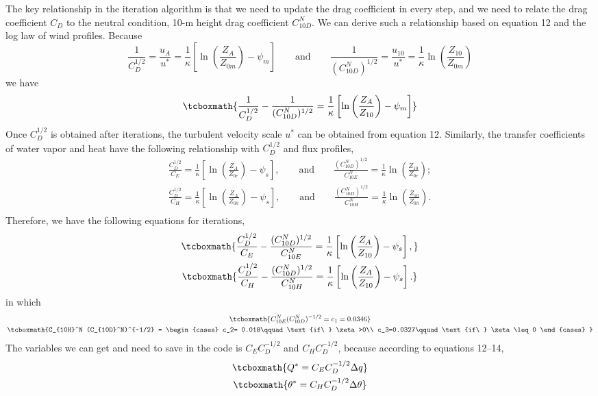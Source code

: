 \documentclass[a4paper,11pt]{article}
\begin{document}
The key relationship in the iteration algorithm is that we need to update the drag coefficient in every step, and we need to relate the drag coefficient $C_D$ to the neutral condition, 10-m height drag coefficient $C_{10D}^N$. We can derive such a relationship based on equation 12 and the log law of wind profiles. Because
\begin{equation*}
\frac{1}{C_D^{1/2}} = \frac{u_A}{u^*} = \frac{1}{\kappa}\left[\ln\left(\frac{Z_A}{Z_{0m}}\right) - \psi_m \right]\qquad \text{and}\qquad
\frac{1}{(C_{10D}^N)^{1/2}} = \frac{u_{10}}{u^*}= \frac{1}{\kappa}\ln\left(\frac{Z_{10}}{Z_{0m}}\right)
\end{equation*}
we have
\begin{equation}
\tcboxmath{
\frac{1}{C_D^{1/2}} - \frac{1}{ (C_{10D}^N)^{1/2}} = \frac{1}{\kappa}\left[ \ln\left(\frac{Z_A}{Z_{10}}\right) - \psi_m\right]
}
\end{equation}
Once $C_D^{1/2}$ is obtained after iterations, the turbulent velocity scale $u^*$ can be obtained from equation 12. Similarly, the transfer coefficients of water vapor and heat have the following relationship with $C_D^{1/2}$ and flux profiles,
\begin{gather}
\frac{C_D^{1/2}}{C_E} = \frac{1}{\kappa}\left[\ln\left(\frac{Z_A}{Z_{0e}}\right) - \psi_s  \right], \qquad\text{and}\qquad 
\frac{(C_{10D}^N)^{1/2}}{C_{10E}^N} = \frac{1}{\kappa} \ln\left(\frac{Z_{10}}{Z_{0e}}\right);\\
\frac{C_D^{1/2}}{C_H} = \frac{1}{\kappa}\left[\ln\left(\frac{Z_A}{Z_{0h}}\right) - \psi_s  \right], \qquad\text{and}\qquad 
\frac{(C_{10D}^N)^{1/2}}{C_{10H}^N} = \frac{1}{\kappa} \ln\left(\frac{Z_{10}}{Z_{0h}}\right).\\
\end{gather}
Therefore, we have the following equations for iterations,
\begin{gather}
\tcboxmath{\frac{C_D^{1/2}}{C_E} - \frac{(C_{10D}^N)^{1/2}}{C_{10E}^N} = \frac{1}{\kappa}\left[\ln\left(\frac{Z_A}{Z_{10}}\right) - \psi_s  \right],} \\
\tcboxmath{\frac{C_D^{1/2}}{C_H} - \frac{(C_{10D}^N)^{1/2}}{C_{10H}^N} = \frac{1}{\kappa}\left[\ln\left(\frac{Z_A}{Z_{10}}\right) - \psi_s  \right].}
\end{gather}
in which
\begin{gather}
\tcboxmath{
C_{10E}^N (C_{10D}^N)^{-1/2} = c_1 = 0.0346
}\\
 \tcboxmath{C_{10H}^N (C_{10D}^N)^{-1/2} = 
 \begin{cases}
    c_2= 0.018\qquad \text{if\ } \zeta>0\\
    c_3=0.0327\qquad \text{if\ } \zeta\leq 0
 \end{cases}
 }
\end{gather}
The variables we can get and need to save in the code is $C_E C_D^{-1/2}$ and $C_H C_D^{-1/2}$, because according to equations 12--14, 
\begin{gather}
\tcboxmath{Q^* = C_E C_D^{-1/2} \Delta q}\\
\tcboxmath{\theta^* = C_H C_D^{-1/2} \Delta \theta}
\end{gather}
\end{document}
